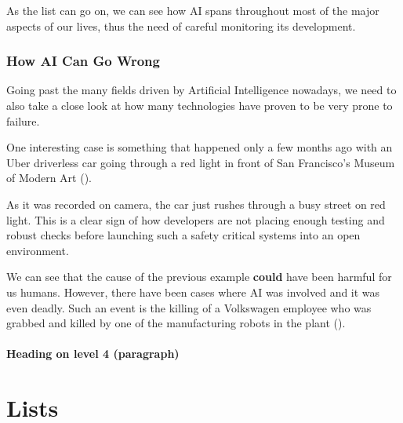 \documentclass[paper=a4, fontsize=11pt]{scrartcl} %
\numberwithin{equation}{section} %
\numberwithin{figure}{section} %
\numberwithin{table}{section} %
\begin{document}
\par
As the list can go on, we can see how AI spans throughout most of the major aspects of our lives, thus the need of careful monitoring its development.


\subsubsection{How AI Can Go Wrong}

\par
Going past the many fields driven by Artificial Intelligence nowadays, we need to also take a close look at how many technologies have proven to be very prone to failure. 

\par
One interesting case is something that happened only a few months ago with an Uber driverless car going through a red light in front of San Francisco's Museum of Modern Art (\citet{uber-red-light}).

\par
As it was recorded on camera, the car just rushes through a busy street on red light. This is a clear sign of how developers are not placing enough testing and robust checks before launching such a safety critical systems into an open environment. 

\par
We can see that the cause of the previous example \textbf{could} have been harmful for us humans. However, there have been cases where AI was involved and it was even deadly. Such an event is the killing of a Volkswagen employee who was grabbed and killed by one of the manufacturing robots in the plant ().

\lipsum[3] %

\paragraph{Heading on level 4 (paragraph)}

\lipsum[6] %


\section{Lists}
\end{document}
